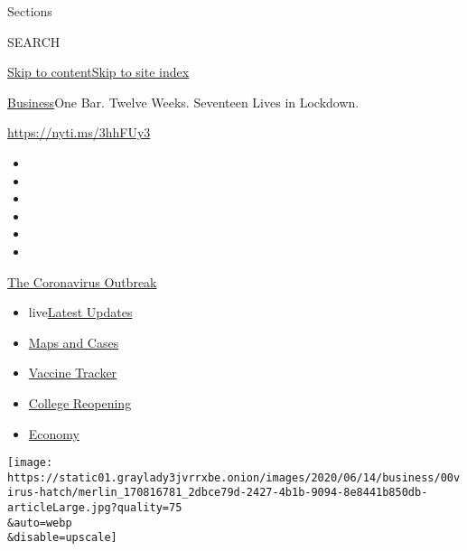 Sections

SEARCH

\protect\hyperlink{site-content}{Skip to
content}\protect\hyperlink{site-index}{Skip to site index}

\href{/section/business}{Business}\textbar{}One Bar. Twelve Weeks.
Seventeen Lives in Lockdown.

\url{https://nyti.ms/3hhFUy3}

\begin{itemize}
\item
\item
\item
\item
\item
\item
\end{itemize}

\href{https://www.nytimes3xbfgragh.onion/news-event/coronavirus?action=click\&pgtype=Article\&state=default\&region=TOP_BANNER\&context=storylines_menu}{The
Coronavirus Outbreak}

\begin{itemize}
\tightlist
\item
  live\href{https://www.nytimes3xbfgragh.onion/2020/08/03/world/coronavirus-covid-19.html?action=click\&pgtype=Article\&state=default\&region=TOP_BANNER\&context=storylines_menu}{Latest
  Updates}
\item
  \href{https://www.nytimes3xbfgragh.onion/interactive/2020/us/coronavirus-us-cases.html?action=click\&pgtype=Article\&state=default\&region=TOP_BANNER\&context=storylines_menu}{Maps
  and Cases}
\item
  \href{https://www.nytimes3xbfgragh.onion/interactive/2020/science/coronavirus-vaccine-tracker.html?action=click\&pgtype=Article\&state=default\&region=TOP_BANNER\&context=storylines_menu}{Vaccine
  Tracker}
\item
  \href{https://www.nytimes3xbfgragh.onion/2020/08/02/us/covid-college-reopening.html?action=click\&pgtype=Article\&state=default\&region=TOP_BANNER\&context=storylines_menu}{College
  Reopening}
\item
  \href{https://www.nytimes3xbfgragh.onion/live/2020/08/03/business/stock-market-today-coronavirus?action=click\&pgtype=Article\&state=default\&region=TOP_BANNER\&context=storylines_menu}{Economy}
\end{itemize}

\texttt{[image: https://static01.graylady3jvrrxbe.onion/images/2020/06/14/business/00virus-hatch/merlin\_170816781\_2dbce79d-2427-4b1b-9094-8e8441b850db-articleLarge.jpg?quality=75\\\&auto=webp\\\&disable=upscale]}

